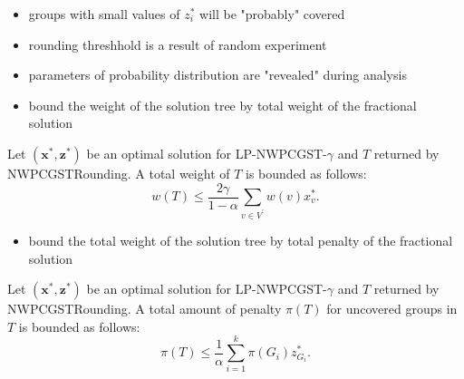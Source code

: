\documentclass{beamer}
\begin{document}
\begin{frame}{\insertsection}{\insertsubsection}
    \begin{itemize}
        \item groups with small values of $z_i^{\ast}$ will be "probably" covered
        \item rounding threshhold is a result of random experiment
        \item parameters of probability distribution are "revealed" during analysis
        
    \end{itemize}


\end{frame}

\begin{frame}{\insertsection}{\insertsubsection}
    \begin{itemize}
        \item bound the weight of the solution tree by total \alert{weight} of the fractional solution
    \end{itemize}
    \begin{lemma}
        Let $(\mathbf{x}^\ast,\mathbf{z}^\ast)$ be an optimal solution for LP-NWPCGST-$\gamma$ and $T$ returned by \textrm{NWPCGSTRounding}. A total weight of $T$ is bounded as follows:
$$w(T)\leq\frac{2\gamma}{1-\alpha}\sum_{v\in V^\prime}{w(v)x_v^\ast}.$$
    \end{lemma}

\end{frame}


\begin{frame}{\insertsection}{\insertsubsection}
    \begin{itemize}
        \item bound the total weight of the solution tree by total \alert{penalty} of the fractional solution
    \end{itemize}
    \begin{lemma}
        Let $(\mathbf{x}^\ast,\mathbf{z}^\ast)$ be an optimal solution for LP-NWPCGST-$\gamma$ and $T$ returned by \textrm{NWPCGSTRounding}. A total amount of penalty $\pi\left(T\right)$ for uncovered groups in $T$ is bounded as follows:
$$\pi\left(T\right)\leq\frac{1}{\alpha}\sum_{i=1}^{k}{\pi\left(G_i\right)z_{G_i}^\ast}.$$

    \end{lemma}

\end{frame}
\end{document}

